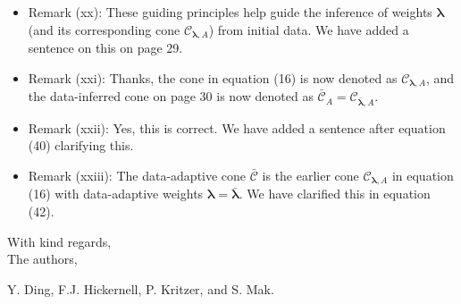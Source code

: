 \documentclass[11pt]{article}
\newcommand{\calC}{\mathcal{C}}
\begin{document}
\begin{itemize}
\item Remark (xx): These guiding principles help guide the inference of weights $\boldsymbol{\lambda}$ (and its corresponding cone $\calC_{\boldsymbol{\lambda},A}$) from initial data. We have added a sentence on this on page 29. 
\item Remark (xxi): Thanks, the cone in equation (16) is now denoted as $\calC_{\boldsymbol{\lambda},A}$, and the data-inferred cone on page 30 is now denoted as $\bar{\calC}_A = \calC_{\bar{\boldsymbol{\lambda}},A}$.
\item Remark (xxii): Yes, this is correct. We have added a sentence after equation (40) clarifying this.
\item Remark (xxiii): The data-adaptive cone $\bar{\calC}$ is the earlier cone $\calC_{\boldsymbol{\lambda},A}$ in equation (16) with data-adaptive weights $\boldsymbol{\lambda} = \bar{\boldsymbol{\lambda}}$. We have clarified this in equation (42).

\end{itemize}

\bigskip 

\bigskip

\noindent With kind regards,\\[0.25cm]
The authors, 

\noindent Y. Ding, F.J. Hickernell, P. Kritzer, and S. Mak.
\end{document}
